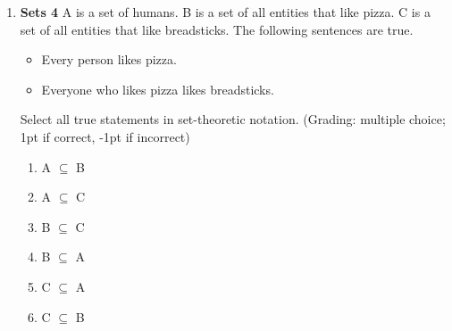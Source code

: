 \documentclass[a4,11pt]{article}
\begin{document}
\begin{enumerate}[leftmargin = 12pt]
Select all true statements in set-theoretic notation. (Grading: multiple choice; 1pt if correct, -1pt if incorrect)

\begin{enumerate}
\item A $\cap$ B $\neq$ $\emptyset$
\item A $\cap$ B = $\emptyset$
\item A $\cap$ C $\neq$ $\emptyset$
\item A $\cap$ C = $\emptyset$
\item A $\subseteq$ C 
\item B $\subseteq$ C 
\item C $\subseteq$ B
\end{enumerate}

{\bf Model answer:} The correct answers are (b), (c), (f). (b) captures the sentence \textit{No dog like Whiskas}, i.e. the intersection of dogs and entities that like Whiskas is empty. (c) captures the sentence \textit{some dogs are snorers}, i.e. the intersection of dogs and is not empty. (f) captures the sentence \textit{Everyone who likes Whiskas is a snorer}.

(a) is false, it would be true if some dogs liked Whiskas. (d) is false, it would be true if no dog snored. (e) is false, it would be true if all dogs were snorers. (g) is false, it would be true, if all snorers would be Whiskas-lovers.


\item {\bf Sets 4}  A is a set of humans. B is a set of all entities that like pizza. C is a set of all entities that like breadsticks.  The following sentences are true. 

\begin{itemize}[noitemsep]
\item Every person likes pizza.
\item Everyone who likes pizza likes breadsticks.
\end{itemize}

Select all true statements in set-theoretic notation. (Grading: multiple choice; 1pt if correct, -1pt if incorrect)

\begin{enumerate}
\item A $\subseteq$ B
\item A $\subseteq$ C
\item B $\subseteq$ C
\item B $\subseteq$ A
\item C $\subseteq$ A
\item C $\subseteq$ B
\end{enumerate}


\end{enumerate}
\end{document}
